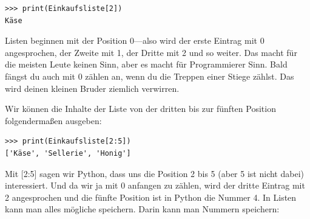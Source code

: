 \begin{Verbatim}[frame=single]
>>> print(Einkaufsliste[2])
Käse
\end{Verbatim}

Listen beginnen mit der Position 0---also wird der erste Eintrag mit 0 angesprochen, der Zweite mit 1, der Dritte mit 2 und so weiter. Das macht für die meisten Leute keinen Sinn, aber es macht für Programmierer Sinn. Bald fängst du auch mit 0 zählen an, wenn du die Treppen einer Stiege zählst. Das wird deinen kleinen Bruder ziemlich verwirren.
\par
Wir können die Inhalte der Liste von der dritten bis zur fünften Position folgendermaßen ausgeben:

\begin{Verbatim}[frame=single]
>>> print(Einkaufsliste[2:5])
['Käse', 'Sellerie', 'Honig']
\end{Verbatim}

Mit [2:5] sagen wir Python, dass uns die Position 2 bis 5 (aber 5 ist nicht dabei) interessiert. Und da wir ja mit 0 anfangen zu zählen, wird der dritte Eintrag mit 2 angesprochen und die fünfte Position ist in Python die Nummer 4. In Listen kann man alles mögliche speichern. Darin kann man Nummern speichern:


